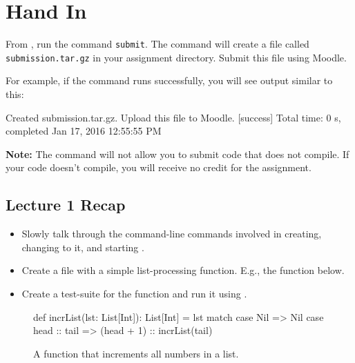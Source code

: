 \documentclass{book}
\begin{document}
\section{Hand In}

From \sbt{}, run the command \verb|submit|. The command will create
a file called \verb|submission.tar.gz| in your assignment directory.
Submit this file using Moodle.

For example, if the command runs successfully, you will see output similar
to this:
%
\begin{console}
Created submission.tar.gz. Upload this file to Moodle.
[success] Total time: 0 s, completed Jan 17, 2016 12:55:55 PM
\end{console}

\textbf{Note:}  The command will not allow you to submit code that does not
compile. If your code doesn't compile, you will receive no credit for the
assignment.

\newlecture

\begin{instructor}

\section{Lecture 1 Recap}

\begin{itemize}

  \item Slowly talk through the command-line commands involved in creating,
  changing to it, and starting \sbt{}.

  \item Create a file with a simple list-processing function. E.g., the
   function below.

  \item Create a test-suite for the function and run it using \sbt{}.


\end{itemize}

\end{instructor}

\begin{figure}
\begin{scalacode}
def incrList(lst: List[Int]): List[Int] = lst match {
  case Nil => Nil
  case head :: tail => (head + 1) :: incrList(tail)
}
\end{scalacode}

\caption{A function that increments all numbers in a list.}
\label{incrlist}
\end{figure}
\end{document}
